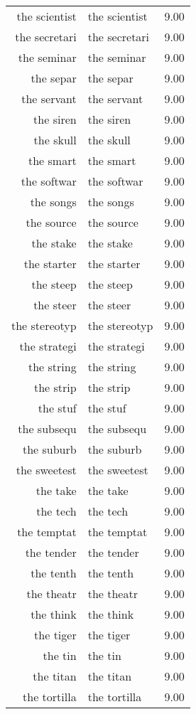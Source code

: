 \begin{table}[ht]
\begin{tabular}{rlr}
  the scientist & the scientist & 9.00 \\ 
  the secretari & the secretari & 9.00 \\ 
  the seminar & the seminar & 9.00 \\ 
  the separ & the separ & 9.00 \\ 
  the servant & the servant & 9.00 \\ 
  the siren & the siren & 9.00 \\ 
  the skull & the skull & 9.00 \\ 
  the smart & the smart & 9.00 \\ 
  the softwar & the softwar & 9.00 \\ 
  the songs & the songs & 9.00 \\ 
  the source & the source & 9.00 \\ 
  the stake & the stake & 9.00 \\ 
  the starter & the starter & 9.00 \\ 
  the steep & the steep & 9.00 \\ 
  the steer & the steer & 9.00 \\ 
  the stereotyp & the stereotyp & 9.00 \\ 
  the strategi & the strategi & 9.00 \\ 
  the string & the string & 9.00 \\ 
  the strip & the strip & 9.00 \\ 
  the stuf & the stuf & 9.00 \\ 
  the subsequ & the subsequ & 9.00 \\ 
  the suburb & the suburb & 9.00 \\ 
  the sweetest & the sweetest & 9.00 \\ 
  the take & the take & 9.00 \\ 
  the tech & the tech & 9.00 \\ 
  the temptat & the temptat & 9.00 \\ 
  the tender & the tender & 9.00 \\ 
  the tenth & the tenth & 9.00 \\ 
  the theatr & the theatr & 9.00 \\ 
  the think & the think & 9.00 \\ 
  the tiger & the tiger & 9.00 \\ 
  the tin & the tin & 9.00 \\ 
  the titan & the titan & 9.00 \\ 
  the tortilla & the tortilla & 9.00 \\ 

\end{tabular}
\end{table}

